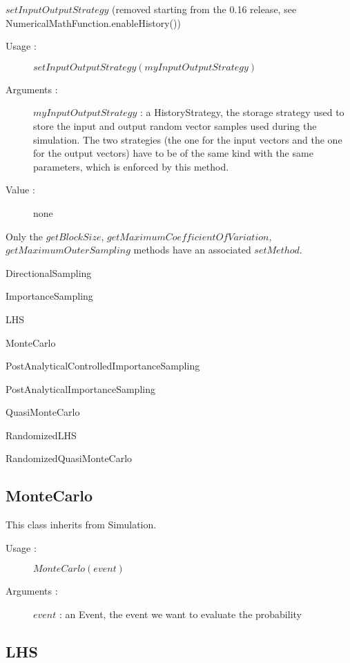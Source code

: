 \begin{description}
\begin{description}
  \item $setInputOutputStrategy$ (removed starting from the 0.16 release, see NumericalMathFunction.enableHistory())
    \begin{description}
    \item[Usage :] $setInputOutputStrategy(myInputOutputStrategy)$
    \item[Arguments :] $myInputOutputStrategy$ : a HistoryStrategy, the storage strategy used to store the input and output random vector samples used during the simulation. The two strategies (the one for the input vectors and the one for the output vectors) have to be of the same kind with the same parameters, which is enforced by this method.
    \item[Value :]  none
    \end{description}
    \bigskip

    Only the $getBlockSize$, $getMaximumCoefficientOfVariation$,\\
    $getMaximumOuterSampling$ methods have an associated $setMethod$.

  \item[Derivative Classes :] \rule{0pt}{1em}
    \begin{description}
    \item DirectionalSampling
    \item ImportanceSampling
    \item LHS
    \item MonteCarlo
    \item PostAnalyticalControlledImportanceSampling
    \item PostAnalyticalImportanceSampling
    \item QuasiMonteCarlo
    \item RandomizedLHS
    \item RandomizedQuasiMonteCarlo
    \end{description}

  \end{description}
\end{description}

\newpage \subsection{MonteCarlo}

This class inherits from Simulation.

\begin{description}
\item[Usage :] $MonteCarlo(event)$

\item[Arguments :]  $event$ : an Event, the event we want to evaluate the probability

\end{description}
\newpage \subsection{LHS}

